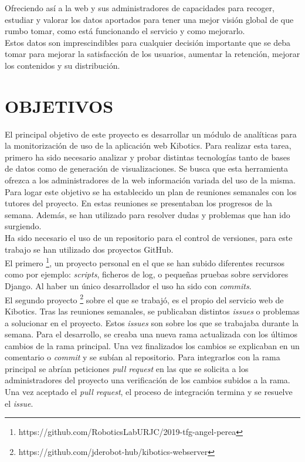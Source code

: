 \documentclass[11pt,a4paper]{book}
\begin{document}
			Ofreciendo así a la web y sus administradores de capacidades para recoger, estudiar y valorar los datos aportados para tener una mejor visión global de que rumbo tomar, como está funcionando el servicio y como mejorarlo. \\
			
			Estos datos son imprescindibles para cualquier decisión importante que se deba tomar para mejorar la satisfacción de los usuarios, aumentar la retención, mejorar los contenidos y su distribución.
	\chapter{OBJETIVOS}
		El principal objetivo de este proyecto es desarrollar un módulo de analíticas para la monitorización de uso de la aplicación web Kibotics. Para realizar esta tarea, primero ha sido necesario analizar y probar distintas tecnologías tanto de bases de datos como de generación de visualizaciones. Se busca que esta herramienta ofrezca a los administradores de la web información variada del uso de la misma.\\
		
		Para logar este objetivo se ha establecido un plan de reuniones semanales con los tutores del proyecto. En estas reuniones se presentaban los progresos de la semana. Además, se han utilizado para resolver dudas y problemas que han ido surgiendo.\\
		
		Ha sido necesario el uso de un repositorio para el control de versiones, para este trabajo se han utilizado dos proyectos GitHub.\\
	 	
	 	El primero \footnote{https://github.com/RoboticsLabURJC/2019-tfg-angel-perea}, un proyecto personal en el que se han subido diferentes recursos como por ejemplo: \textit{scripts}, ficheros de log, o pequeñas pruebas sobre servidores Django. Al haber un único desarrollador el uso ha sido con \textit{commits}.\\
		
		El segundo proyecto \footnote{https://github.com/jderobot-hub/kibotics-webserver} sobre el que se trabajó, es el propio del servicio web de Kibotics. Tras las reuniones semanales, se publicaban distintos \textit{issues} o problemas a solucionar en el proyecto. Estos \textit{issues} son sobre los que se trabajaba durante la semana. Para el desarrollo, se creaba una nueva rama actualizada con los últimos cambios de la rama principal. Una vez finalizados los cambios se explicaban en un comentario o \textit{commit} y se subían al repositorio. Para integrarlos con la rama principal se abrían peticiones \textit{pull request} en las que se solicita a los administradores del proyecto una verificación de los cambios subidos a la rama. Una vez aceptado el \textit{pull request}, el proceso de integración termina y se resuelve el \textit{issue}.
		
\end{document}
